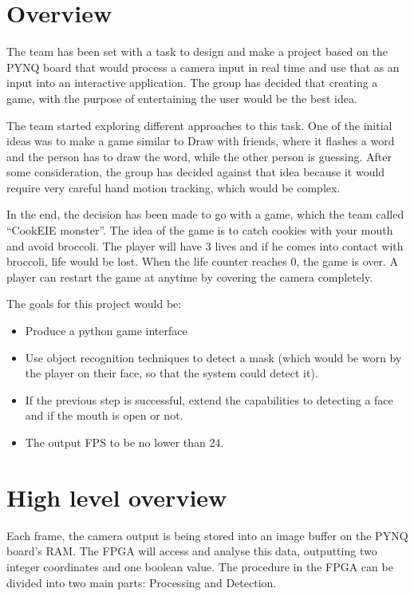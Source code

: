\section{Overview}
The team has been set with a task to design and make a project based on the PYNQ board that would process a camera input in real time and use that as an input into an interactive application. The group has decided that creating a game, with the purpose of entertaining the user would be the best idea. 

The team started exploring different approaches to this task. One of the initial ideas was to make a game similar to Draw with friends, where it flashes a word and the person has to draw the word, while the other person is guessing. After some consideration, the group has decided against that idea because it would require very careful hand motion tracking, which would be complex.

	In the end, the decision has been made to go with a game, which the team called “CookEIE monster”. The idea of the game is to catch cookies with your mouth and avoid broccoli. The player will have 3 lives and if he comes into contact with broccoli, life would be lost. When the life counter reaches 0, the game is over. A player can restart the game at anytime by covering the camera completely.


The goals for this project would be:
\begin{itemize}
  \item Produce a python game interface
  \item Use object recognition techniques to detect a mask (which would be worn by the player on their face, so that the system could detect it).
  \item If the previous step is successful, extend the capabilities to detecting a face and if the mouth is open or not.
  \item The output FPS to be no lower than 24.
\end{itemize}

\section{High level overview}


Each frame, the camera output is being stored into an image buffer on the PYNQ board’s RAM. The FPGA will access and analyse this data, outputting two integer coordinates and one boolean value. The procedure in the FPGA can be divided into two main parts: Processing and Detection. 

